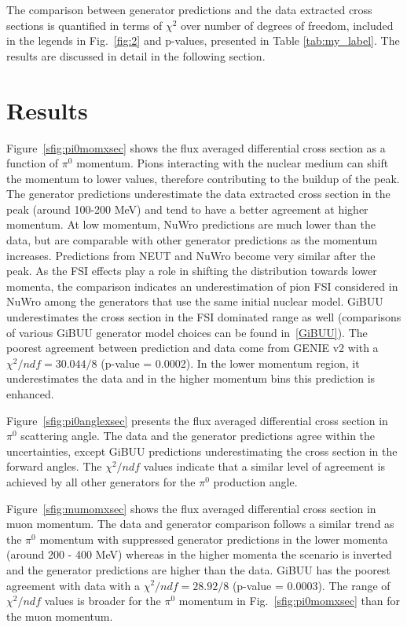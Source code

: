 \documentclass[%
 reprint,
 amsmath,amssymb, longbibliography,
 aps, 
 prd,
 twocolumn,
 showpacs,
 superscriptaddress
]{revtex4-2}
\begin{document}
The comparison between generator predictions and the data extracted cross sections is quantified in terms of $\chi^2$ over number of degrees of freedom, included in the legends in Fig.~\ref{fig:2} and p-values, presented in Table \ref{tab:my_label}. The results are discussed in detail in the following section. 

\section{Results}

Figure~\ref{sfig:pi0momxsec} shows the flux averaged differential cross section as a function of $\pi^0$ momentum. Pions interacting with the nuclear medium can shift the momentum to lower values, therefore contributing to the buildup of the peak. The generator predictions underestimate the data extracted cross section in the peak (around 100-200 MeV) and tend to have a better agreement at higher momentum. At low momentum, NuWro predictions are much lower than the data, but are comparable with other generator predictions as the momentum increases. Predictions from NEUT and NuWro become very similar after the peak. As the FSI effects play a role in shifting the distribution towards lower momenta, the comparison indicates an underestimation of pion FSI considered in NuWro among the generators that use the same initial nuclear model. GiBUU underestimates the cross section in the FSI dominated range as well (comparisons of various GiBUU generator model choices can be found in~\ref{GiBUU}). The poorest agreement between prediction and data come from GENIE v2 with a $\chi^2/ndf = 30.044/8$ (p-value = 0.0002). In the lower momentum region, it underestimates the data and in the higher momentum bins this prediction is enhanced. 

Figure~\ref{sfig:pi0anglexsec} presents the flux averaged differential cross section in $\pi^0$ scattering angle. The data and the generator predictions agree within the uncertainties, except GiBUU predictions underestimating the cross section in the forward angles. The $\chi^2/ndf$ values indicate that a similar level of agreement is achieved by all other generators for the $\pi^0$ production angle. 

Figure~\ref{sfig:mumomxsec} shows the flux averaged differential cross section in muon momentum. The data and generator comparison follows a similar trend as the $\pi^0$ momentum with suppressed generator predictions in the lower momenta (around 200 - 400 MeV) whereas in the higher momenta the scenario is inverted and the generator predictions are higher than the data. GiBUU has the poorest agreement with data with a $\chi^2/ndf = 28.92/8$ (p-value = 0.0003). The range of $\chi^2/ndf$ values is broader for the $\pi^0$ momentum in Fig.~\ref{sfig:pi0momxsec} than for the muon momentum. 
\end{document}
